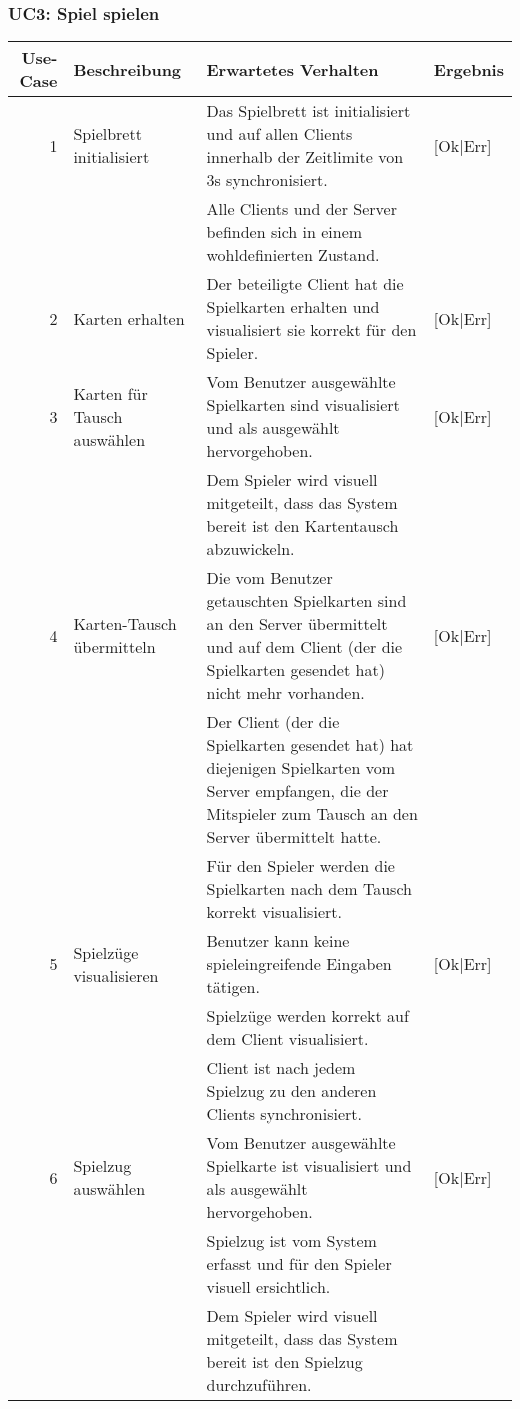 \documentclass[a4paper,12pt,halfparskip,DIV14]{scrartcl}
\begin{document}
\subsubsection{UC3: Spiel spielen}\label{sub:uc3_spiel_spielen} %
\begin {tabular}{r | p{3cm} | p{8cm} | l}
\hline \hline
\textbf{Use-Case} & \textbf{Beschreibung} & \textbf{Erwartetes Verhalten} & \textbf{Ergebnis} \\
\hline
1 & Spielbrett initialisiert & Das Spielbrett ist initialisiert und auf allen Clients innerhalb der Zeitlimite von 3s synchronisiert. & [Ok|Err] \\
 \cline{3-4} & & Alle Clients und der Server befinden sich in einem wohldefinierten Zustand. & \\
\hline
2 & Karten erhalten & Der beteiligte Client hat die Spielkarten erhalten und visualisiert sie korrekt für den Spieler. & [Ok|Err] \\
\hline
3 & Karten für Tausch auswählen & Vom Benutzer ausgewählte Spielkarten sind visualisiert und als ausgewählt hervorgehoben. & [Ok|Err] \\
 \cline{3-4} & & Dem Spieler wird visuell mitgeteilt, dass das System bereit ist den Kartentausch abzuwickeln. & \\
\hline
4 & Karten-Tausch übermitteln & Die vom Benutzer getauschten Spielkarten sind an den Server übermittelt und auf dem Client (der die Spielkarten gesendet hat) nicht mehr vorhanden. & [Ok|Err] \\
 \cline{3-4} & & Der Client (der die Spielkarten gesendet hat) hat diejenigen Spielkarten vom Server empfangen, die der Mitspieler zum Tausch an den Server übermittelt hatte. & \\
 \cline{3-4} & & Für den Spieler werden die Spielkarten nach dem Tausch korrekt visualisiert. & \\
\hline
5 & Spielzüge visualisieren & Benutzer kann keine spieleingreifende Eingaben tätigen. & [Ok|Err] \\
 \cline{3-4} & & Spielzüge werden korrekt auf dem Client visualisiert. & \\
 \cline{3-4} & & Client ist nach jedem Spielzug zu den anderen Clients synchronisiert. & \\
\hline
6 & Spielzug auswählen & Vom Benutzer ausgewählte Spielkarte ist visualisiert und als ausgewählt hervorgehoben. & [Ok|Err] \\
 \cline{3-4} & & Spielzug ist vom System erfasst und für den Spieler visuell ersichtlich. & \\
 \cline{3-4} & & Dem Spieler wird visuell mitgeteilt, dass das System bereit ist den Spielzug durchzuführen. & \\
\hline
\end{tabular}
\end{document}
